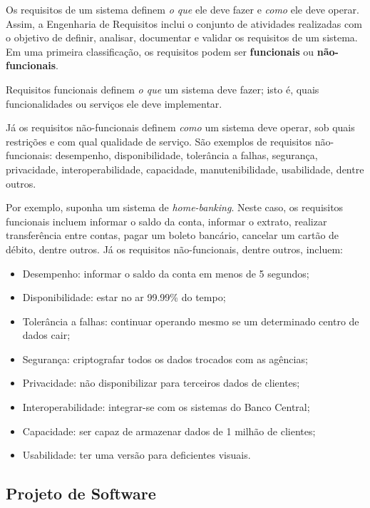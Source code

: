 \documentclass[
  11pt,
  twoside]{book}
\begin{document}
 Os requisitos de um sistema
definem \emph{o que} ele deve fazer e \emph{como} ele deve operar.
Assim, a Engenharia de Requisitos inclui o conjunto de atividades
realizadas com o objetivo de definir, analisar, documentar e validar os
requisitos de um sistema. Em uma primeira classificação, os requisitos
podem ser \textbf{funcionais} ou \textbf{não-funcionais}.

 Requisitos funcionais definem \emph{o que}
um sistema deve fazer; isto é, quais funcionalidades ou serviços ele
deve implementar.

 Já os requisitos não-funcionais
definem \emph{como} um sistema deve operar, sob quais restrições e com
qual qualidade de serviço. São exemplos de requisitos não-funcionais:
desempenho, disponibilidade, tolerância a falhas, segurança,
privacidade, interoperabilidade, capacidade, manutenibilidade,
usabilidade, dentre outros.

Por exemplo, suponha um sistema de \emph{home-banking}. Neste caso, os
requisitos funcionais incluem informar o saldo da conta, informar o
extrato, realizar transferência entre contas, pagar um boleto bancário,
cancelar um cartão de débito, dentre outros. Já os requisitos
não-funcionais, dentre outros, incluem:

\begin{itemize}
\item
  Desempenho: informar o saldo da conta em menos de 5 segundos;
\item
  Disponibilidade: estar no ar 99.99\% do tempo;
\item
  Tolerância a falhas: continuar operando mesmo se um determinado centro
  de dados cair;
\item
  Segurança: criptografar todos os dados trocados com as agências;
\item
  Privacidade: não disponibilizar para terceiros dados de clientes;
\item
  Interoperabilidade: integrar-se com os sistemas do Banco Central;
\item
  Capacidade: ser capaz de armazenar dados de 1 milhão de clientes;
\item
  Usabilidade: ter uma versão para deficientes visuais.
\end{itemize}

\hypertarget{projeto-de-software}{%
\subsection{Projeto de Software}\label{projeto-de-software}}
\end{document}
